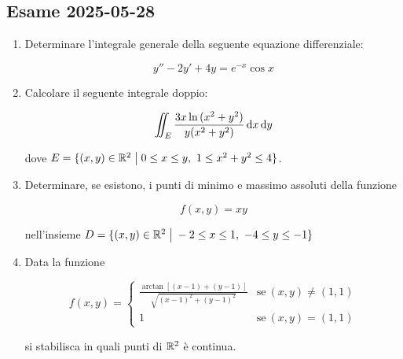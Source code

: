 \subsection{Esame 2025{-}05{-}28}

\begin{enumerate}
    \itemsep32pt
    \item Determinare l'integrale generale della seguente equazione differenziale:

          \[
              y'' - 2y' + 4y = e^{-x} \cos{x}
          \]

    \item Calcolare il seguente integrale doppio:

          \[
              \iint_{E} \frac{3x \ln{(x^2 + y^2)}}{y(x^2 + y^2)} \mathop{}\!\mathrm{d}{x}\mathop{}\!\mathrm{d}{y}
          \]

          dove \(E = \{(x,y) \in \mathbb{R}^{2} \;\big|\; 0 \le x \le y,\ 1 \le x^2 + y^2 \le 4 \} \).

    \item Determinare, se esistono, i punti di minimo e massimo assoluti della funzione

          \[
              f(x,y) = xy
          \]

          nell'insieme \(D = \{(x,y) \in \mathbb{R}^{2} \;\big|\; -2 \le x \le 1,\ -4 \le y \le -1 \} \)

    \item Data la funzione

          \begin{equation*}
              f(x,y) =
              \begin{cases}
                  \frac{\arctan{[(x-1)+(y-1)]}}{\sqrt{{(x-1)}^2 + {(y-1)}^2}} & \text{se}\ (x,y) \neq (1,1) \\[4mm]
                  1                                                           & \text{se}\ (x,y) = (1,1)
              \end{cases}
          \end{equation*}

          si stabilisca in quali punti di \(\mathbb{R}^2\) è continua.

\end{enumerate}
